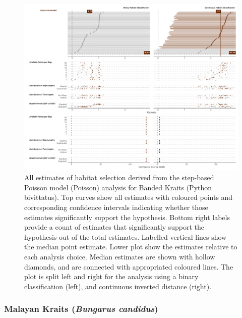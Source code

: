 \documentclass[10pt,a4paper]{article}
\begin{document}
\begin{figure}
\includegraphics[width=1\linewidth]{../../figures/specCurve_Python bivittatus_pois} \caption{All estimates of habitat selection derived from the step-based Poisson model (Poisson) analysis for Banded Kraits (Python bivittatus). Top curves show all estimates with coloured points and corresponding confidence intervals indicating whether those estimates significantly support the hypothesis. Bottom right labels provide a count of estimates that significantly support the hypothesis out of the total estimates. Labelled vertical lines show the median point estimate. Lower plot show the estimates relative to each analysis choice. Median estimates are shown with hollow diamonds, and are connected with appropriated coloured lines. The plot is split left and right for the analysis using a binary classification (left), and continuous inverted distance (right).}\label{fig:specCurvePoisPYBI}
\end{figure}

\subsubsection{\texorpdfstring{Malayan Kraits (\emph{Bungarus candidus})}{Malayan Kraits (Bungarus candidus)}}\label{malayan-kraits-bungarus-candidus}
\end{document}
